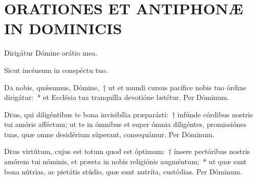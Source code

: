 \documentclass[vesperale_romanum.tex]{subfiles}
\begin{document}
\thispagestyle{empty}

\section[Dominicæ post Pentecosten.]{ORATIONES ET ANTIPHONÆ IN DOMINICIS}

{} %



\vv Dirigátur Dómine orátio mea. 

\rr Sicut incénsum in conspéctu tuo. %

\oratio

\lettrine{D}{a} nobis, quǽsumus, Dómine,~† ut et mundi cursus pacífice nobis tuo órdine dirigátur:~* et Ecclésia tua tranquílla devotióne lætétur. Per Dóminum.



\oratio

\lettrine{D}{e}us, qui diligéntibus te bona invisibília præparásti:~† infúnde córdibus nostris tui amóris afféctum; ut te in ómnibus et super ómnia diligéntes, promissiónes tuas, quæ omne desidérium súperant, consequámur. Per Dóminum.



\oratio

\lettrine{D}{e}us virtútum, cujus est totum quod est óptimum:~† ínsere pectóribus nostris amórem tui nóminis, et præsta in nobis religiónis augméntum;~* ut quæ sunt bona nútrias, ac pietátis stúdio, quæ sunt nutríta, custódias.
Per Dóminum.



\oratio
\end{document}
